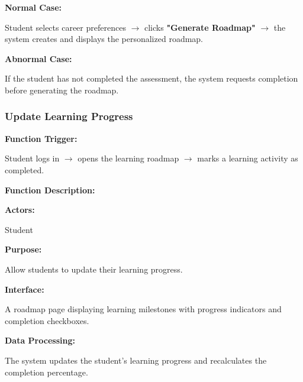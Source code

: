 \textbf{Normal Case:}

Student selects career preferences $\rightarrow$ clicks \textbf{"Generate Roadmap"} $\rightarrow$ the system creates and displays the personalized roadmap.

\textbf{Abnormal Case:}

If the student has not completed the assessment, the system requests completion before generating the roadmap.

%

\subsubsection{Update Learning Progress}

\textbf{Function Trigger:}

Student logs in $\rightarrow$ opens the learning roadmap $\rightarrow$ marks a learning activity as completed.

\vspace{0.3cm}

\textbf{Function Description:}

\textbf{Actors:}

Student

\vspace{0.2cm}

\textbf{Purpose:}

Allow students to update their learning progress.

\vspace{0.2cm}

\textbf{Interface:}

A roadmap page displaying learning milestones with progress indicators and completion checkboxes.

\vspace{0.2cm}

\textbf{Data Processing:}

The system updates the student's learning progress and recalculates the completion percentage.

